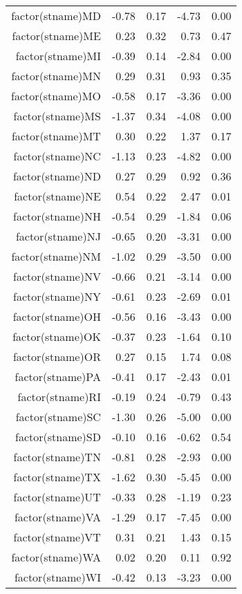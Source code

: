 \begin{table}[ht]
\begin{tabular}{rrrrr}
  factor(stname)MD & -0.78 & 0.17 & -4.73 & 0.00 \\ 
  factor(stname)ME & 0.23 & 0.32 & 0.73 & 0.47 \\ 
  factor(stname)MI & -0.39 & 0.14 & -2.84 & 0.00 \\ 
  factor(stname)MN & 0.29 & 0.31 & 0.93 & 0.35 \\ 
  factor(stname)MO & -0.58 & 0.17 & -3.36 & 0.00 \\ 
  factor(stname)MS & -1.37 & 0.34 & -4.08 & 0.00 \\ 
  factor(stname)MT & 0.30 & 0.22 & 1.37 & 0.17 \\ 
  factor(stname)NC & -1.13 & 0.23 & -4.82 & 0.00 \\ 
  factor(stname)ND & 0.27 & 0.29 & 0.92 & 0.36 \\ 
  factor(stname)NE & 0.54 & 0.22 & 2.47 & 0.01 \\ 
  factor(stname)NH & -0.54 & 0.29 & -1.84 & 0.06 \\ 
  factor(stname)NJ & -0.65 & 0.20 & -3.31 & 0.00 \\ 
  factor(stname)NM & -1.02 & 0.29 & -3.50 & 0.00 \\ 
  factor(stname)NV & -0.66 & 0.21 & -3.14 & 0.00 \\ 
  factor(stname)NY & -0.61 & 0.23 & -2.69 & 0.01 \\ 
  factor(stname)OH & -0.56 & 0.16 & -3.43 & 0.00 \\ 
  factor(stname)OK & -0.37 & 0.23 & -1.64 & 0.10 \\ 
  factor(stname)OR & 0.27 & 0.15 & 1.74 & 0.08 \\ 
  factor(stname)PA & -0.41 & 0.17 & -2.43 & 0.01 \\ 
  factor(stname)RI & -0.19 & 0.24 & -0.79 & 0.43 \\ 
  factor(stname)SC & -1.30 & 0.26 & -5.00 & 0.00 \\ 
  factor(stname)SD & -0.10 & 0.16 & -0.62 & 0.54 \\ 
  factor(stname)TN & -0.81 & 0.28 & -2.93 & 0.00 \\ 
  factor(stname)TX & -1.62 & 0.30 & -5.45 & 0.00 \\ 
  factor(stname)UT & -0.33 & 0.28 & -1.19 & 0.23 \\ 
  factor(stname)VA & -1.29 & 0.17 & -7.45 & 0.00 \\ 
  factor(stname)VT & 0.31 & 0.21 & 1.43 & 0.15 \\ 
  factor(stname)WA & 0.02 & 0.20 & 0.11 & 0.92 \\ 
  factor(stname)WI & -0.42 & 0.13 & -3.23 & 0.00 \\ 

\end{tabular}
\end{table}
